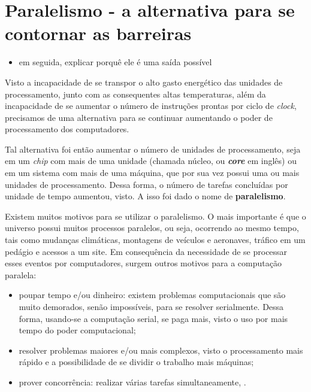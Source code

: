 \section{Paralelismo - a alternativa para se contornar as barreiras}

    \begin{itemize}
        \item em seguida, explicar porquê ele é uma saída possível
    \end{itemize}
    
    Visto a incapacidade de se transpor o alto gasto energético das 
    unidades de processamento, junto com as consequentes altas temperaturas,
    além da incapacidade de se aumentar o número de instruções prontas por 
    ciclo de \textit{clock}, precisamos de uma alternativa para se continuar 
    aumentando o poder de processamento dos computadores. 
    
    Tal alternativa foi então aumentar o número de unidades de processamento,
    seja em um \textit{chip} com mais de uma unidade (chamada núcleo, ou 
    \textbf{\textit{core}} em inglês) ou em um sistema com mais de uma 
    máquina, que por sua vez possui uma ou mais unidades de processamento. 
    Dessa forma, o número de tarefas concluídas por unidade de tempo aumentou,
    visto.
    A isso foi dado o nome de \textbf{paralelismo}.
    
    Existem muitos motivos para se utilizar o paralelismo. O mais importante é
    que o universo possui muitos processos paralelos, ou seja, ocorrendo ao 
    mesmo tempo, tais como mudanças climáticas, montagens de veículos e 
    aeronaves, tráfico em um pedágio e acessos a um site. Em consequência da 
    necessidade de se processar esses eventos por computadores, surgem outros motivos para a computação paralela:
    \begin{itemize}
    	\item poupar tempo e/ou dinheiro: existem problemas computacionais 
    	que são muito demorados, senão impossíveis, para se resolver
    	serialmente. Dessa forma, usando-se a computação serial, se paga mais,
    	visto o uso por mais tempo do poder computacional;
    	\item resolver problemas maiores e/ou mais complexos, visto o
    	processamento mais rápido e a possibilidade de se dividir o trabalho
    	mais máquinas;
    	\item prover concorrência: realizar várias tarefas simultaneamente,
    	 \cite{LLNL:parcomp}.
    \end{itemize}
    
